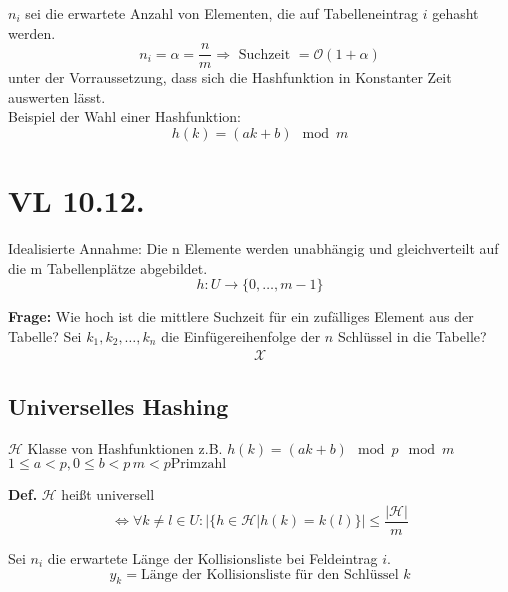 \documentclass[a4paper,draft,twoside,10pt]{report}
\begin{document}
$n_i$ sei die erwartete Anzahl von Elementen, die auf Tabelleneintrag $i$ gehasht werden.
\[n_i=\alpha =\frac{n}{m}\Rightarrow \mbox{ Suchzeit }=\mathcal O(1+\alpha)\]
unter der Vorraussetzung, dass sich die Hashfunktion in Konstanter Zeit auswerten lässt.\\
Beispiel der Wahl einer Hashfunktion:
\[h(k)=(ak+b)\mod m\]


\chapter{VL 10.12.}
Idealisierte Annahme:
Die n Elemente werden unabhängig und gleichverteilt auf die m Tabellenplätze abgebildet.
\[h: U\rightarrow \{0, \hdots, m-1\}\]

\textbf{Frage:} Wie hoch ist die mittlere Suchzeit für ein zufälliges Element aus der Tabelle?
Sei $k_1,k_2,\hdots , k_n$ die Einfügereihenfolge der $n$ Schlüssel in die Tabelle?
\begin{align*}
\mathcal X 
\end{align*}


\section{Universelles Hashing}
$\mathcal H$ Klasse von Hashfunktionen
z.B. $h(k) = (ak+b) \mod p \mod m $
$1\le a < p, 0\le b < p \, m<p \mbox{Primzahl}$

\textbf{Def.} $\mathcal H$ heißt universell
\[\Leftrightarrow \forall k \ne l \in U : | \{h\in \mathcal H | h (k) = k(l) \} |\le \frac{|\mathcal H|}{m}\]

Sei $n_i$ die erwartete Länge der Kollisionsliste bei Feldeintrag $i$.
\[y_k = \mbox{Länge der Kollisionsliste für den Schlüssel $k$}\]
\end{document}
